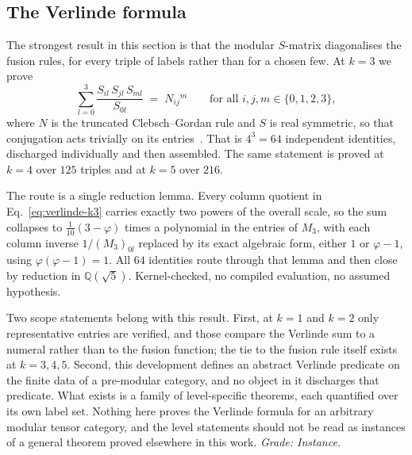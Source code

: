 \documentclass[aps,prx,nofootinbib,superscriptaddress,12pt]{revtex4-2}
\begin{document}
\subsection{The Verlinde formula}

The strongest result in this section is that the modular $S$-matrix
diagonalises the fusion rules, for every triple of labels rather than
for a chosen few. At $k = 3$ we prove
\begin{equation}
  \sum_{l=0}^{3} \frac{S_{il}\,S_{jl}\,S_{ml}}{S_{0l}}
  \;=\; N_{ij}{}^{m}
  \qquad \text{for all } i,j,m \in \{0,1,2,3\},
  \label{eq:verlinde-k3}
\end{equation}
where $N$ is the truncated Clebsch--Gordan rule and $S$ is real
symmetric, so that conjugation acts trivially on its
entries~\cite{Verlinde1988}. That is $4^3 = 64$ independent identities,
discharged individually and then assembled. The same statement is proved
at $k = 4$ over $125$ triples and at $k = 5$ over $216$.


The route is a single reduction lemma. Every column quotient in
Eq.~\eqref{eq:verlinde-k3} carries exactly two powers of the overall
scale, so the sum collapses to $\tfrac{1}{10}(3-\varphi)$ times a
polynomial in the entries of $M_3$, with each column inverse
$1/(M_3)_{0l}$ replaced by its exact algebraic form, either $1$ or
$\varphi - 1$, using $\varphi(\varphi-1) = 1$. All $64$ identities route
through that lemma and then close by reduction in $\mathbb{Q}(\sqrt5)$.
Kernel-checked, no compiled evaluation, no assumed hypothesis.

Two scope statements belong with this result. First, at $k = 1$ and
$k = 2$ only representative entries are verified, and those compare the
Verlinde sum to a numeral rather than to the fusion function; the tie to
the fusion rule itself exists at $k = 3,4,5$. Second, this development
defines an abstract Verlinde predicate on the finite data of a
pre-modular category, and no object in it discharges that predicate.
What exists is a family of level-specific theorems, each quantified over
its own label set. Nothing here proves the Verlinde formula for an
arbitrary modular tensor category, and the level statements should not
be read as instances of a general theorem proved elsewhere in this work.
\emph{Grade: Instance.}
\end{document}
